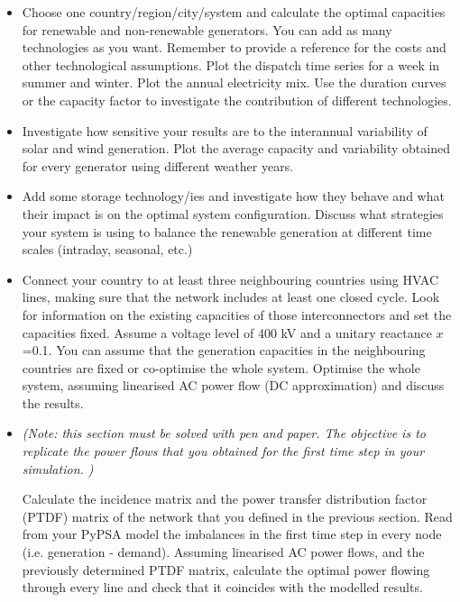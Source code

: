 \documentclass[10pt]{article}
\begin{document}
\begin{itemize}

\item[a)] Choose one country/region/city/system and calculate the optimal capacities for renewable and non-renewable generators. You can add as many technologies as you want. Remember to provide a reference for the costs and other technological assumptions. Plot the dispatch time series for a week in summer and winter. Plot the annual electricity mix. Use the duration curves or the capacity factor to investigate the contribution of different technologies.


\item[b)] Investigate how sensitive your results are to the interannual variability of solar and wind generation. Plot the average capacity and variability obtained for every generator using different weather years.

\item[c)] Add some storage technology/ies and investigate how they behave and what their impact is on the optimal system configuration. Discuss what strategies your system is using to balance the renewable generation at different time scales (intraday, seasonal, etc.)

\item[d)] Connect your country to at least three neighbouring countries using HVAC lines, making sure that the network includes at least one closed cycle. Look for information on the existing capacities of those interconnectors and set the capacities fixed. Assume a voltage level of 400 kV and a unitary reactance $x$=0.1. You can assume that the generation capacities in the neighbouring countries are fixed or co-optimise the whole system. Optimise the whole system, assuming linearised AC power flow (DC approximation) and discuss the results.

\item[e)] \textit{(Note: this section must be solved with pen and paper. The objective is to replicate the power flows that you obtained for the first time step in your simulation. )}

Calculate the incidence matrix and the power transfer distribution factor (PTDF) matrix of the network that you defined in the previous section. Read from your PyPSA model the imbalances in the first time step in every node (i.e. generation - demand). Assuming linearised AC power flows, and the previously determined PTDF matrix, calculate the optimal power flowing through every line and check that it coincides with the modelled results.
 

\end{itemize}
\end{document}
